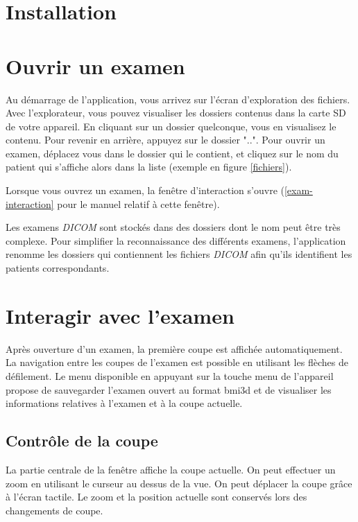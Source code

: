 \section{Installation}

\section{Ouvrir un examen}

Au démarrage de l'application, vous arrivez sur l'écran d'exploration des fichiers. Avec l'explorateur, vous pouvez visualiser les dossiers contenus dans la carte SD de votre appareil. En cliquant sur un dossier quelconque, vous en visualisez le contenu. Pour revenir en arrière, appuyez sur le dossier "..". Pour ouvrir un examen, déplacez vous dans le dossier qui le contient, et cliquez sur le nom du patient qui s'affiche alors dans la liste (exemple en figure \vref{fichiers}).

Lorsque vous ouvrez un examen, la fenêtre d'interaction s'ouvre (\vref{exam-interaction} pour le manuel relatif à cette fenêtre).

\begin{note} %
Les examens \emph{DICOM} sont stockés dans des dossiers dont le nom peut être très complexe. Pour simplifier la reconnaissance des différents examens, l'application renomme les dossiers qui contiennent les fichiers \emph{DICOM} afin qu'ils identifient les patients correspondants.
\end{note}

\section{Interagir avec l'examen} \label{exam-interaction}

Après ouverture d'un examen, la première coupe est affichée automatiquement. La navigation entre les coupes de l'examen est possible en utilisant les flèches de défilement. Le menu disponible en appuyant sur la touche menu de l'appareil propose de sauvegarder l'examen ouvert au format bmi3d et de visualiser les informations relatives à l'examen et à la coupe actuelle.

\subsection{Contrôle de la coupe}
La partie centrale de la fenêtre affiche la coupe actuelle. On peut effectuer un zoom en utilisant le curseur au dessus de la vue. On peut déplacer la coupe grâce à l'écran tactile. Le zoom et la position actuelle sont conservés lors des changements de coupe.


